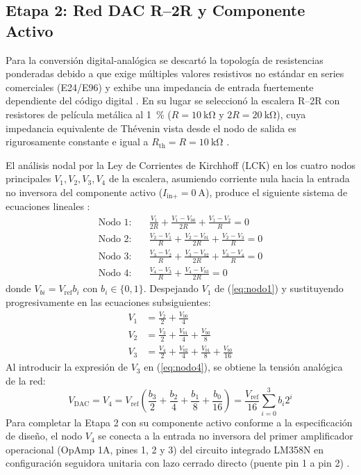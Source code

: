 \documentclass[journal,transmag]{IEEEtran}
\begin{document}
\subsection{Etapa 2: Red DAC R--2R y Componente Activo}
Para la conversión digital-analógica se descartó la topología de resistencias ponderadas debido a que exige múltiples valores resistivos no estándar en series comerciales (E24/E96) y exhibe una impedancia de entrada fuertemente dependiente del código digital \cite{franco2015,sedra2020}. En su lugar se seleccionó la escalera R--2R con resistores de película metálica al \SI{1}{\percent} ($R = \SI{10}{\kilo\ohm}$ y $2R = \SI{20}{\kilo\ohm}$), cuya impedancia equivalente de Thévenin vista desde el nodo de salida es rigurosamente constante e igual a $R_{\text{th}} = R = \SI{10}{\kilo\ohm}$ \cite{hayt2012,franco2015}.

El análisis nodal por la Ley de Corrientes de Kirchhoff (LCK) en los cuatro nodos principales $V_1, V_2, V_3, V_4$ de la escalera, asumiendo corriente nula hacia la entrada no inversora del componente activo ($I_{\text{in+}} = \SI{0}{\ampere}$), produce el siguiente sistema de ecuaciones lineales \cite{hayt2012,alexander2018}:
\begin{align}
\text{Nodo 1:}\quad & \frac{V_1}{2R} + \frac{V_1 - V_{b0}}{2R} + \frac{V_1 - V_2}{R} = 0 \label{eq:nodo1} \\
\text{Nodo 2:}\quad & \frac{V_2 - V_1}{R} + \frac{V_2 - V_{b1}}{2R} + \frac{V_2 - V_3}{R} = 0 \label{eq:nodo2} \\
\text{Nodo 3:}\quad & \frac{V_3 - V_2}{R} + \frac{V_3 - V_{b2}}{2R} + \frac{V_3 - V_4}{R} = 0 \label{eq:nodo3} \\
\text{Nodo 4:}\quad & \frac{V_4 - V_3}{R} + \frac{V_4 - V_{b3}}{2R} = 0 \label{eq:nodo4}
\end{align}
donde $V_{bi} = V_{\text{ref}} b_i$ con $b_i \in \{0, 1\}$. Despejando $V_1$ de (\ref{eq:nodo1}) y sustituyendo progresivamente en las ecuaciones subsiguientes:
\begin{align}
V_1 &= \frac{V_2}{2} + \frac{V_{b0}}{4} \\
V_2 &= \frac{V_3}{2} + \frac{V_{b1}}{4} + \frac{V_{b0}}{8} \\
V_3 &= \frac{V_4}{2} + \frac{V_{b2}}{4} + \frac{V_{b1}}{8} + \frac{V_{b0}}{16}
\end{align}
Al introducir la expresión de $V_3$ en (\ref{eq:nodo4}), se obtiene la tensión analógica de la red:
\begin{equation}
V_{\text{DAC}} = V_4 = V_{\text{ref}}\left(\frac{b_3}{2} + \frac{b_2}{4} + \frac{b_1}{8} + \frac{b_0}{16}\right) = \frac{V_{\text{ref}}}{16}\sum_{i=0}^{3} b_i 2^i
\label{eq:vdac}
\end{equation}
Para completar la Etapa 2 con su componente activo conforme a la especificación de diseño, el nodo $V_4$ se conecta a la entrada no inversora del primer amplificador operacional (OpAmp 1A, pines 1, 2 y 3) del circuito integrado LM358N en configuración seguidora unitaria con lazo cerrado directo (puente pin 1 a pin 2) \cite{ti_lm358}.
\end{document}
